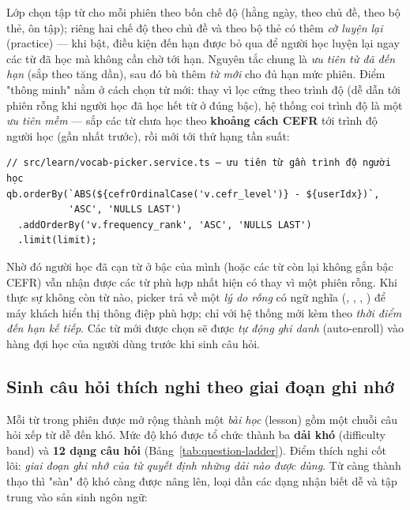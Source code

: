 Lớp  chọn tập từ cho mỗi phiên theo bốn chế độ
(hằng ngày, theo chủ đề, theo bộ thẻ, ôn tập); riêng hai chế độ theo chủ đề
và theo bộ thẻ có thêm \textit{cờ luyện lại} (practice) --- khi bật, điều kiện
đến hạn  được bỏ qua để người học luyện lại ngay
các từ đã học mà không cần chờ tới hạn. Nguyên tắc chung là \textit{ưu tiên
từ đã đến hạn} (sắp theo  tăng dần), sau đó bù thêm
\textit{từ mới} cho đủ hạn mức phiên. Điểm "thông minh" nằm ở
cách chọn từ mới: thay vì lọc cứng theo trình độ (dễ dẫn tới phiên rỗng khi
người học đã học hết từ ở đúng bậc), hệ thống coi trình độ là một
\textit{ưu tiên mềm} --- sắp các từ chưa học theo \textbf{khoảng cách CEFR}
tới trình độ người học (gần nhất trước), rồi mới tới thứ hạng tần suất:

\begin{verbatim}
// src/learn/vocab-picker.service.ts — ưu tiên từ gần trình độ người học
qb.orderBy(`ABS(${cefrOrdinalCase('v.cefr_level')} - ${userIdx})`,
           'ASC', 'NULLS LAST')
  .addOrderBy('v.frequency_rank', 'ASC', 'NULLS LAST')
  .limit(limit);
\end{verbatim}

Nhờ đó người học đã cạn từ ở bậc của mình (hoặc các từ còn lại không gắn bậc
CEFR) vẫn nhận được các từ phù hợp nhất hiện có thay vì một phiên rỗng. Khi
thực sự không còn từ nào, picker trả về một \textit{lý do rỗng} có ngữ nghĩa
(, , ,
) để máy khách hiển thị thông điệp phù hợp; chỉ với
 hệ thống mới kèm theo \textit{thời điểm đến hạn kế tiếp}.
Các từ mới được chọn sẽ được \textit{tự động ghi danh} (auto-enroll) vào hàng
đợi học của người dùng trước khi sinh câu hỏi.

\subsection{Sinh câu hỏi thích nghi theo giai đoạn ghi nhớ}
\label{subsec:impl-questions}

Mỗi từ trong phiên được  mở rộng thành một
\textit{bài học} (lesson) gồm một chuỗi câu hỏi xếp từ dễ đến khó. Mức độ khó
được tổ chức thành ba \textbf{dải khó} (difficulty band) và \textbf{12 dạng
câu hỏi} (Bảng~\ref{tab:question-ladder}). Điểm thích nghi cốt lõi:
\textit{giai đoạn ghi nhớ của từ quyết định những dải nào được dùng}. Từ càng
thành thạo thì "sàn" độ khó càng được nâng lên, loại dần các dạng nhận biết
dễ và tập trung vào sản sinh ngôn ngữ:

